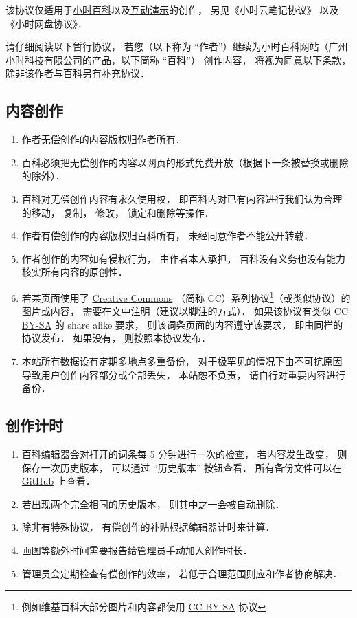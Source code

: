 
该协议仅适用于\href{http://wuli.wiki/online/}{小时百科}以及\href{http://wuli.wiki/apps/}{互动演示}的创作， 另见《小时云笔记协议》 以及《小时网盘协议》．

请仔细阅读以下暂行协议， 若您（以下称为 “作者”）继续为小时百科网站（广州小时科技有限公司的产品，以下简称 “百科”） 创作内容， 将视为同意以下条款， 除非该作者与百科另有补充协议．

\subsection{内容创作}
\begin{enumerate}
\item 作者无偿创作的内容版权归作者所有．
\item 百科必须把无偿创作的内容以网页的形式免费开放（根据下一条被替换或删除的除外）．
\item 百科对无偿创作内容有永久使用权， 即百科内对已有内容进行我们认为合理的移动， 复制， 修改， 锁定和删除等操作．
\item 作者有偿创作的内容版权归百科所有， 未经同意作者不能公开转载．
\item 作者创作的内容如有侵权行为， 由作者本人承担， 百科没有义务也没有能力核实所有内容的原创性．
\item 若某页面使用了 \href{https://creativecommons.org/licenses/}{Creative Commons} （简称 CC）系列协议\footnote{例如维基百科大部分图片和内容都使用 \href{https://creativecommons.org/licenses/by-sa/3.0/}{CC BY-SA} 协议}（或类似协议）的图片或内容， 需要在文中注明（建议以脚注的方式）． 如果该协议有类似 \href{https://creativecommons.org/licenses/by-sa/3.0/}{CC BY-SA} 的 share alike 要求， 则该词条页面的内容遵守该要求， 即由同样的协议发布． 如果没有， 则按照本协议发布．
\item 本站所有数据设有定期多地点多重备份， 对于极罕见的情况下由不可抗原因导致用户创作内容部分或全部丢失， 本站恕不负责， 请自行对重要内容进行备份．
\end{enumerate}

\subsection{创作计时}
\begin{enumerate}
\item 百科编辑器会对打开的词条每 5 分钟进行一次的检查， 若内容发生改变， 则保存一次历史版本， 可以通过 “历史版本” 按钮查看． 所有备份文件可以在 \href{https://github.com/MacroUniverse/PhysWiki-backup}{GitHub} 上查看．
\item 若出现两个完全相同的历史版本， 则其中之一会被自动删除．
\item 除非有特殊协议， 有偿创作的补贴根据编辑器计时来计算．
\item 画图等额外时间需要报告给管理员手动加入创作时长．
\item 管理员会定期检查有偿创作的效率， 若低于合理范围则应和作者协商解决．
\end{enumerate}

